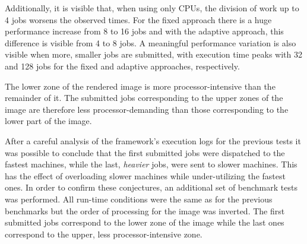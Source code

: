\documentclass[runningheads,a4paper]{llncs}
\begin{document}
Additionally, it is visible that, when using only CPUs, the division of work up to 4 jobs worsens the observed times. For the fixed approach there is a huge performance increase from 8 to 16 jobs and with the adaptive approach, this difference is visible from 4 to 8 jobs. A meaningful performance variation is also visible when more, smaller jobs are submitted, with execution time peaks with 32 and 128 jobs for the fixed and adaptive approaches, respectively.

The lower zone of the rendered image is more processor-intensive than the remainder of it. The submitted jobs corresponding to the upper zones of the image are therefore less processor-demanding than those corresponding to the lower part of the image.

After a careful analysis of the framework's execution logs for the previous tests it was possible to conclude that the first submitted jobs were dispatched to the fastest machines, while the last, \emph{heavier} jobs, were sent to slower machines. This has the effect of overloading slower machines while under-utilizing the fastest ones. In order to confirm these conjectures, an additional set of benchmark tests was performed. All run-time conditions were the same as for the previous benchmarks but the order of processing for the image was inverted. The first submitted jobs correspond to the lower zone of the image while the last ones correspond to the upper, less processor-intensive zone.








\end{document}

